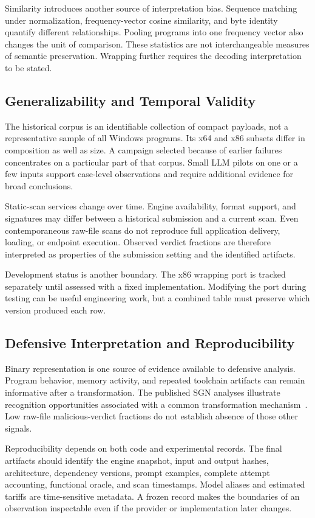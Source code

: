 Similarity introduces another source of interpretation bias. Sequence
matching under normalization, frequency-vector cosine similarity, and
byte identity quantify different relationships. Pooling programs into
one frequency vector also changes the unit of comparison. These
statistics are not interchangeable measures of semantic preservation.
Wrapping further requires the decoding interpretation to be stated.

\subsection{Generalizability and Temporal Validity}
The historical corpus is an identifiable collection of compact
payloads, not a representative sample of all Windows programs. Its
x64 and x86 subsets differ in composition as well as size. A campaign
selected because of earlier failures concentrates on a particular
part of that corpus. Small LLM pilots on one or a few inputs support
case-level observations and require additional evidence for broad
conclusions.

Static-scan services change over time. Engine availability, format
support, and signatures may differ between a historical submission
and a current scan. Even contemporaneous raw-file scans do not
reproduce full application delivery, loading, or endpoint execution.
Observed verdict fractions are therefore interpreted as properties
of the submission setting and the identified artifacts.

Development status is another boundary. The x86 wrapping port is
tracked separately until assessed with a fixed implementation.
Modifying the port during testing can be useful engineering work,
but a combined table must preserve which version produced each row.

\subsection{Defensive Interpretation and Reproducibility}
Binary representation is one source of evidence available to defensive
analysis. Program behavior, memory activity, and repeated toolchain
artifacts can remain informative after a transformation. The
published SGN analyses illustrate recognition opportunities associated
with a common transformation mechanism~\cite{sgnstrong}. Low raw-file
malicious-verdict fractions do not establish absence of those other
signals.

Reproducibility depends on both code and experimental records. The
final artifacts should identify the engine snapshot, input and output
hashes, architecture, dependency versions, prompt examples, complete
attempt accounting, functional oracle, and scan timestamps. Model
aliases and estimated tariffs are time-sensitive metadata. A frozen
record makes the boundaries of an observation inspectable even if
the provider or implementation later changes.
